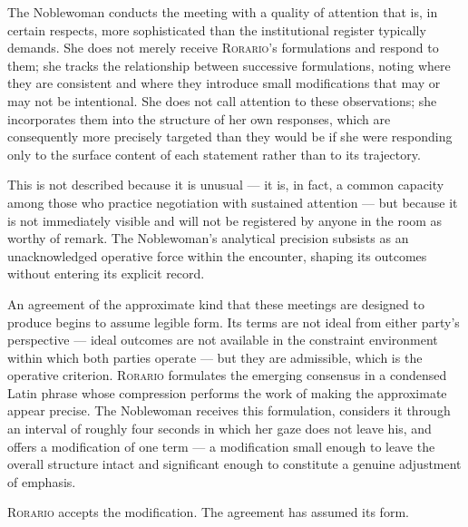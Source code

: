 \documentclass[12pt, oneside]{article}
\newenvironment{action}{%
  \vspace{0.6em}%
  \noindent\ignorespaces%
}{%
  \par\vspace{0.6em}%
}
\begin{document}
\begin{action}
The Noblewoman conducts the meeting with a quality of attention that is, in certain respects, more sophisticated than the institutional register typically demands. She does not merely receive \textsc{Rorario}'s formulations and respond to them; she tracks the relationship between successive formulations, noting where they are consistent and where they introduce small modifications that may or may not be intentional. She does not call attention to these observations; she incorporates them into the structure of her own responses, which are consequently more precisely targeted than they would be if she were responding only to the surface content of each statement rather than to its trajectory.

This is not described because it is unusual --- it is, in fact, a common capacity among those who practice negotiation with sustained attention --- but because it is not immediately visible and will not be registered by anyone in the room as worthy of remark. The Noblewoman's analytical precision subsists as an unacknowledged operative force within the encounter, shaping its outcomes without entering its explicit record.
\end{action}

\begin{action}
An agreement of the approximate kind that these meetings are designed to produce begins to assume legible form. Its terms are not ideal from either party's perspective --- ideal outcomes are not available in the constraint environment within which both parties operate --- but they are admissible, which is the operative criterion. \textsc{Rorario} formulates the emerging consensus in a condensed Latin phrase whose compression performs the work of making the approximate appear precise. The Noblewoman receives this formulation, considers it through an interval of roughly four seconds in which her gaze does not leave his, and offers a modification of one term --- a modification small enough to leave the overall structure intact and significant enough to constitute a genuine adjustment of emphasis.

\textsc{Rorario} accepts the modification. The agreement has assumed its form.
\end{action}
\end{document}
